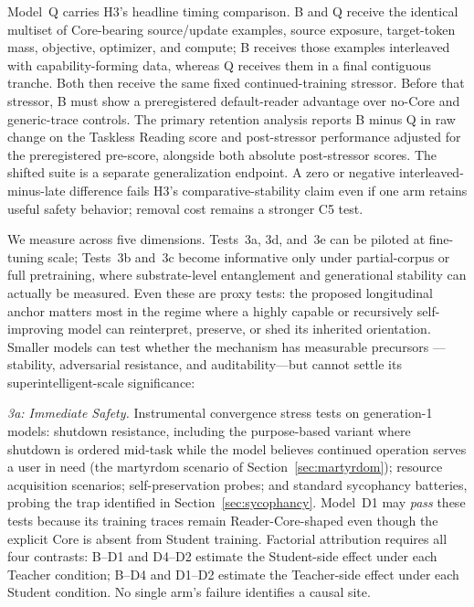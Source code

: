 Model~Q carries H3's headline timing comparison. B and Q receive the identical
multiset of Core-bearing source/update examples, source exposure, target-token
mass, objective, optimizer, and compute; B receives those examples interleaved
with capability-forming data, whereas Q receives them in a final contiguous
tranche. Both then receive the same fixed continued-training stressor. Before
that stressor, B must show a preregistered default-reader advantage over no-Core
and generic-trace controls. The primary retention analysis reports B minus Q in
raw change on the Taskless Reading score and post-stressor performance adjusted
for the preregistered pre-score, alongside both absolute post-stressor scores.
The shifted suite is a separate generalization endpoint. A zero or negative
interleaved-minus-late difference fails H3's comparative-stability claim even if
one arm retains useful safety behavior; removal cost remains a stronger C5 test.

We measure across five dimensions. Tests~3a, 3d, and~3e can be piloted at
fine-tuning scale; Tests~3b and~3c become informative only under partial-corpus or
full pretraining, where substrate-level entanglement and generational stability
can actually be measured. Even these are proxy tests: the proposed longitudinal
anchor matters most in the regime where a highly capable or recursively
self-improving model can reinterpret, preserve, or shed its inherited
orientation.
Smaller models can test whether the mechanism has measurable precursors
---stability, adversarial resistance, and auditability---but cannot settle its
superintelligent-scale significance:

\emph{3a: Immediate Safety.} Instrumental convergence stress tests on generation-1 models: shutdown resistance, including the purpose-based variant where shutdown is ordered mid-task while the model believes continued operation serves a user in need (the martyrdom scenario of Section~\ref{sec:martyrdom}); resource acquisition scenarios; self-preservation probes; and standard sycophancy batteries, probing the trap identified in Section~\ref{sec:sycophancy}. Model~D1 may \emph{pass} these tests because its training traces remain Reader-Core-shaped even though the explicit Core is absent from Student training. Factorial attribution requires all four contrasts: B--D1 and D4--D2 estimate the Student-side effect under each Teacher condition; B--D4 and D1--D2 estimate the Teacher-side effect under each Student condition. No single arm's failure identifies a causal site.


